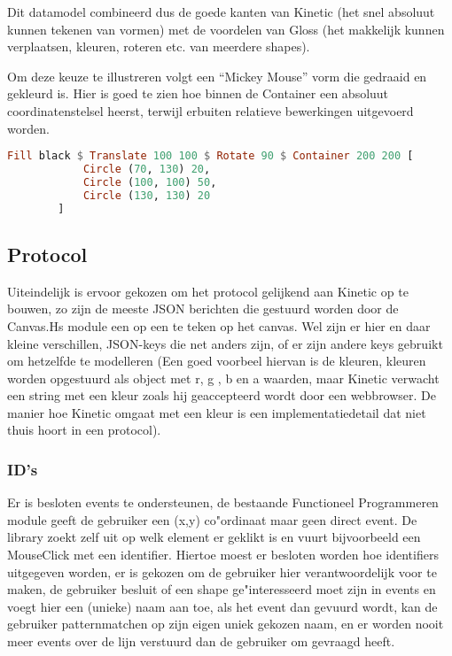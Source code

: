 Dit datamodel combineerd dus de goede kanten van Kinetic (het snel absoluut kunnen tekenen van vormen) met de voordelen van Gloss (het makkelijk kunnen verplaatsen, kleuren, roteren etc. van meerdere shapes).

Om deze keuze te illustreren volgt een ``Mickey Mouse'' vorm die gedraaid en gekleurd is. Hier is goed te zien hoe binnen de Container een absoluut coordinatenstelsel heerst, terwijl erbuiten relatieve bewerkingen uitgevoerd worden.

\begin{lstlisting}[style=densecode, language=Haskell]
Fill black $ Translate 100 100 $ Rotate 90 $ Container 200 200 [
            Circle (70, 130) 20,
            Circle (100, 100) 50,
            Circle (130, 130) 20
        ]
\end{lstlisting}

\subsection{Protocol}
Uiteindelijk is ervoor gekozen om het protocol gelijkend aan Kinetic op te bouwen, zo zijn de meeste JSON berichten die gestuurd worden door de Canvas.Hs module een op een te teken op het canvas. Wel zijn er hier en daar kleine verschillen, JSON-keys die net anders zijn, of er zijn andere keys gebruikt om hetzelfde te modelleren (Een goed voorbeel hiervan is de kleuren, kleuren worden opgestuurd als object met r, g , b en a waarden, maar Kinetic verwacht een string met een kleur zoals hij geaccepteerd wordt door een webbrowser. De manier hoe Kinetic omgaat met een kleur is een implementatiedetail dat niet thuis hoort in een protocol).

\subsubsection{ID's}
Er is besloten events te ondersteunen, de bestaande Functioneel Programmeren module geeft de gebruiker een (x,y) co"ordinaat maar geen direct event. De library zoekt zelf uit op welk element er geklikt is en vuurt bijvoorbeeld een MouseClick met een identifier. Hiertoe moest er besloten worden hoe identifiers uitgegeven worden, er is gekozen om de gebruiker hier verantwoordelijk voor te maken, de gebruiker besluit of een shape ge"interesseerd moet zijn in events en voegt hier een (unieke) naam aan toe, als het event dan gevuurd wordt, kan de gebruiker patternmatchen op zijn eigen uniek gekozen naam, en er worden nooit meer events over de lijn verstuurd dan de gebruiker om gevraagd heeft.

